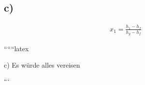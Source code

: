 

\subsection*{c)}

\begin{align*}
x_1 = \frac{h_1 - h_f}{h_g - h_f}
\end{align*}

``````latex

c) Es würde alles vereisen

```